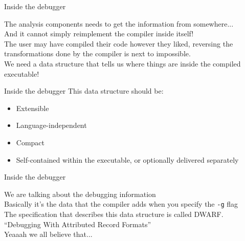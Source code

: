 \begin{frame}{Inside the debugger}
\begin{center}
The analysis components needs to get the information from somewhere...\\
\bigskip
And it cannot simply reimplement the compiler inside itself!\\
\medskip
The user may have compiled their code however they liked, reversing the transformations
done by the compiler is next to impossible.\\
\bigskip
\large
We need a \alert{data structure} that tells us where things are inside the compiled
executable!
\end{center}
\end{frame}


\begin{frame}{Inside the debugger}
This data structure should be:
\begin{itemize}
\item Extensible
\item Language-independent
\item Compact
\item Self-contained within the executable, or optionally delivered separately
\end{itemize}
\end{frame}


\begin{frame}{Inside the debugger}
\begin{center}
We are talking about the \alert{debugging information}\\
\smallskip
Basically it's the data that the compiler adds when you specify the \texttt{-g} flag\\
\bigskip
\large
The specification that describes this data structure is called \alert{DWARF}.\\
\footnotesize
\smallskip
``Debugging With Attributed Record Formats''\\
Yeaaah we all believe that...
\end{center}
\end{frame}



